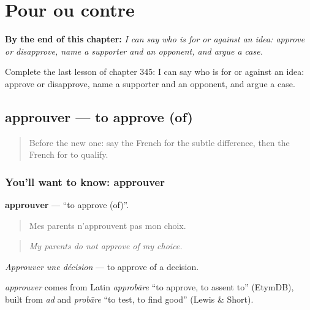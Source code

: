 
\chapter{Pour ou contre}
\label{ch:fr-pour-ou-contre}

\begin{chapteropening}
\textbf{By the end of this chapter:} \emph{I can say who is for or against an idea: approve or disapprove, name a supporter and an opponent, and argue a case.}

Complete the last lesson of chapter 345: I can say who is for or against an idea: approve or disapprove, name a supporter and an opponent, and argue a case.
\end{chapteropening}

\section[approuver]{approuver — to approve (of)}

\label{lesson:FR-C345-approuver}



\begin{quote}
Before the new one: say the French for the subtle difference, then the French for to qualify.
\end{quote}

\subsection*{You'll want to know: approuver}
\textbf{approuver} — \textquotedblleft{}to approve (of)\textquotedblright{}.

\begin{quote}
Mes parents n'approuvent pas mon choix.
\end{quote}

\begin{quote}
\emph{My parents do not approve of my choice.}
\end{quote}

\emph{Approuver une décision} — to approve of a decision.

\begin{cousinweb}
\emph{approuver} comes from Latin \emph{approbāre} \textquotedblleft{}to approve, to assent to\textquotedblright{} (EtymDB), built from \emph{ad} and \emph{probāre} \textquotedblleft{}to test, to find good\textquotedblright{} (Lewis \& Short).
\end{cousinweb}

